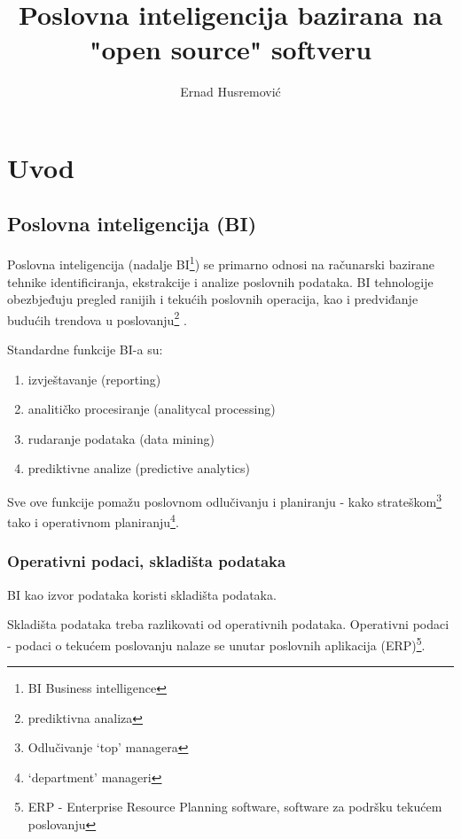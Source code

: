 \documentclass[times, utf8, seminar]{fit}
\begin{document}
\title{Poslovna inteligencija bazirana na "open source" softveru}

\author{Ernad Husremović}


\maketitle

\tableofcontents

\chapter{Uvod}

\section{Poslovna inteligencija (BI)}

Poslovna inteligencija (nadalje BI\footnote{BI Business intelligence}) se primarno odnosi na računarski bazirane tehnike identificiranja, ekstrakcije i analize poslovnih podataka.  BI tehnologije obezbjeđuju pregled ranijih i tekućih poslovnih operacija, kao i predviđanje budućih trendova u poslovanju\footnote{prediktivna analiza} \cite{web:wikipedia:bi}.

Standardne funkcije BI-a su:

\begin{enumerate}
  \item izvještavanje (reporting)
  \item analitičko procesiranje (analitycal processing)
  \item rudaranje podataka (data mining)
  \item prediktivne analize (predictive analytics)
\end{enumerate}

Sve ove funkcije pomažu poslovnom odlučivanju i planiranju - kako strateškom\footnote{Odlučivanje `top' managera} tako i operativnom planiranju\footnote{`department' manageri}.

\subsection{Operativni podaci, skladišta podataka}
\label{operativni_podaci}

BI kao izvor podataka koristi skladišta podataka.

Skladišta podataka treba razlikovati od operativnih podataka. Operativni podaci - podaci o tekućem poslovanju nalaze se unutar poslovnih aplikacija (ERP)\footnote{ERP - Enterprise Resource Planning software, software za podršku tekućem poslovanju}.
\end{document}
